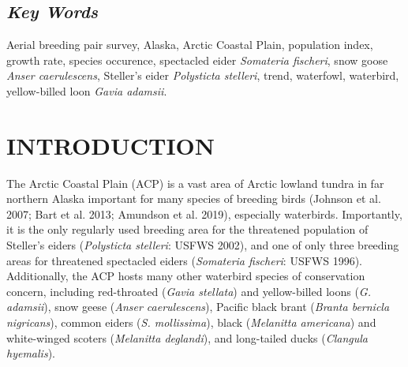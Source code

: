 \documentclass[
]{article}
\begin{document}
\subsection*{\texorpdfstring{\emph{Key
Words}}{Key Words}}\label{key-words}

Aerial breeding pair survey, Alaska, Arctic Coastal Plain, population
index, growth rate, species occurence, spectacled eider \emph{Somateria
fischeri}, snow goose \emph{Anser caerulescens}, Steller's eider
\emph{Polysticta stelleri}, trend, waterfowl, waterbird, yellow-billed
loon \emph{Gavia adamsii}.

\newpage{}

\section*{INTRODUCTION}\label{introduction}

The Arctic Coastal Plain (ACP) is a vast area of Arctic lowland tundra
in far northern Alaska important for many species of breeding birds
(Johnson et al. 2007; Bart et al. 2013; Amundson et al. 2019),
especially waterbirds. Importantly, it is the only regularly used
breeding area for the threatened population of Steller's eiders
(\emph{Polysticta stelleri}: USFWS 2002), and one of only three breeding
areas for threatened spectacled eiders (\emph{Somateria fischeri}: USFWS
1996). Additionally, the ACP hosts many other waterbird species of
conservation concern, including red-throated (\emph{Gavia stellata}) and
yellow-billed loons (\emph{G. adamsii}), snow geese (\emph{Anser
caerulescens}), Pacific black brant (\emph{Branta bernicla nigricans}),
common eiders (\emph{S. mollissima}), black (\emph{Melanitta americana})
and white-winged scoters (\emph{Melanitta deglandi}), and long-tailed
ducks (\emph{Clangula hyemalis}).
\end{document}
